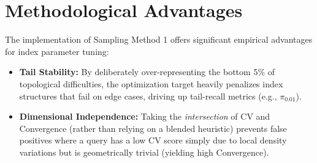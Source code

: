 \documentclass[11pt,a4paper]{article}
\begin{document}
\section{Methodological Advantages}
The implementation of Sampling Method 1 offers significant empirical advantages for index parameter tuning:
\begin{itemize}
    \item \textbf{Tail Stability:} By deliberately over-representing the bottom 5\% of topological difficulties, the optimization target heavily penalizes index structures that fail on edge cases, driving up tail-recall metrics (e.g., $\pi_{0.01}$).
    \item \textbf{Dimensional Independence:} Taking the \textit{intersection} of CV and Convergence (rather than relying on a blended heuristic) prevents false positives where a query has a low CV score simply due to local density variations but is geometrically trivial (yielding high Convergence).
\end{itemize}
\end{document}
